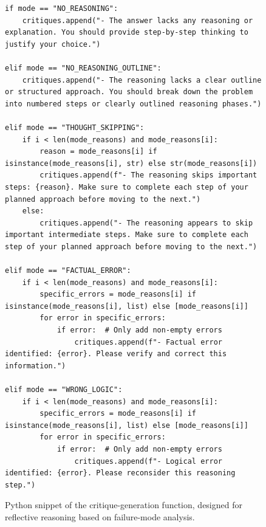 \begin{figure}[t]
    \centering
\begin{lstlisting}[style=mypython]
if mode == "NO_REASONING":
    critiques.append("- The answer lacks any reasoning or explanation. You should provide step-by-step thinking to justify your choice.")

elif mode == "NO_REASONING_OUTLINE":
    critiques.append("- The reasoning lacks a clear outline or structured approach. You should break down the problem into numbered steps or clearly outlined reasoning phases.")

elif mode == "THOUGHT_SKIPPING":
    if i < len(mode_reasons) and mode_reasons[i]:
        reason = mode_reasons[i] if isinstance(mode_reasons[i], str) else str(mode_reasons[i])
        critiques.append(f"- The reasoning skips important steps: {reason}. Make sure to complete each step of your planned approach before moving to the next.")
    else:
        critiques.append("- The reasoning appears to skip important intermediate steps. Make sure to complete each step of your planned approach before moving to the next.")

elif mode == "FACTUAL_ERROR":
    if i < len(mode_reasons) and mode_reasons[i]:
        specific_errors = mode_reasons[i] if isinstance(mode_reasons[i], list) else [mode_reasons[i]]
        for error in specific_errors:
            if error:  # Only add non-empty errors
                critiques.append(f"- Factual error identified: {error}. Please verify and correct this information.")

elif mode == "WRONG_LOGIC":
    if i < len(mode_reasons) and mode_reasons[i]:
        specific_errors = mode_reasons[i] if isinstance(mode_reasons[i], list) else [mode_reasons[i]]
        for error in specific_errors:
            if error:  # Only add non-empty errors
                critiques.append(f"- Logical error identified: {error}. Please reconsider this reasoning step.")
\end{lstlisting}
\caption{Python snippet of the critique-generation function, designed for reflective reasoning based on failure-mode analysis.}
\label{fig:gpt_judge_prompt}
\end{figure}



